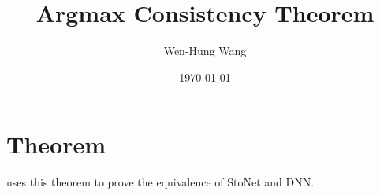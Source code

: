 \documentclass[11pt,twoside]{article}
\title{Argmax Consistency Theorem}
\author{Wen-Hung Wang}
\date{\today}
\begin{document}
\maketitle
\section{Theorem}
\begin{theorem}
    
\end{theorem}

\begin{remark}
    \cite{LiangSLiang2022} uses this theorem to prove the equivalence of StoNet and DNN.
\end{remark}

\clearpage


\end{document}
